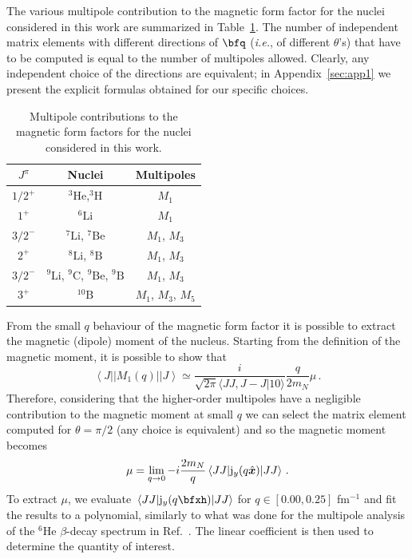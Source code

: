 \documentclass[aps,prc,floatfix,showpacs,twocolumn, preprintnumbers]{revtex4-2}
\newcommand{\beq}{\begin{equation}}
\newcommand{\eeq}{\end{equation}}
\newcommand{\het}{{}^3\text{He}}
\newcommand{\tri}{{}^3\text{H}}
\newcommand{\lisix}{{}^6\text{Li}}
\newcommand{\lisev}{{}^7\text{Li}}
\newcommand{\lieight}{{}^8\text{Li}}
\newcommand{\beight}{{}^8\text{B}}
\newcommand{\besev}{{}^7\text{Be}}
\newcommand{\linin}{{}^9\text{Li}}
\newcommand{\cnin}{{}^9\text{C}}
\newcommand{\benin}{{}^9\text{Be}}
\newcommand{\bnin}{{}^9\text{B}}
\newcommand{\bten}{{}^{10}\text{B}}
\def\beq{\begin{equation}}
\def\eeq{\end{equation}}
\begin{document}
The various multipole contribution to the magnetic form factor for the nuclei  considered in this work are summarized in Table~\ref{tab:tab_multi}. The number of independent matrix elements with different directions of $\bfq$ ({\it i.e.}, of different $\theta$'s) that have to be computed is equal to the number of multipoles allowed. Clearly, any independent choice of the directions are equivalent; in Appendix~\ref{sec:app1} we present the explicit formulas obtained for our specific choices.
\begin{table}[]
    \centering
    \begin{tabular}{ccc}
        \hline
        \hline
         $J^\pi$ & Nuclei & Multipoles \\
            \hline
         $1/2^+$ & $\het$,$\tri$ & $M_1$\\
         $1^+$ & $\lisix$ & $M_1$\\
         $3/2^-$ & $\lisev$, $\besev$ & $M_1$, $M_3$\\
         $2^+$ & $\lieight$, $\beight$ & $M_1$, $M_3$\\
         $3/2^-$ & $\linin$, $\cnin$, $\benin$, $\bnin$ & $M_1$, $M_3$\\
         $3^+$ & $\bten$& $M_1$, $M_3$, $M_5$\\
         \hline
         \hline
    \end{tabular}
    \caption{Multipole contributions to the magnetic form factors for the nuclei considered in this work.}
    \label{tab:tab_multi}
\end{table}


From the small $q$ behaviour of the magnetic form factor it is possible to extract the magnetic (dipole) moment of the nucleus. Starting from the definition of the magnetic moment, it is possible to show that~\cite{Carlson2015}
\begin{equation}
\left\langle J|| M_1(q)|| J\right\rangle \simeq \frac{i}{\sqrt{2 \pi} \langle J J,J -\!J |1 0\rangle} \frac{q}{2 m_N} \mu \,.
\end{equation}
Therefore, considering that the higher-order multipoles have a negligible contribution to the magnetic moment at small $q$ we can select the matrix element computed for $\theta=\pi/2$ (any choice is equivalent) and so the magnetic moment becomes 
\beq
\mu = \lim_{q\to 0} -i \frac{2m_N}{q}\mel{JJ}{\mathrm{j}_y(q \hat{\bm x})}{JJ}\,.
\label{eq:mm}
\eeq
To extract $\mu$, we evaluate $\mel{JJ}{\mathrm{j}_y(q\bfxh)}{JJ}$ for $q \in [0.00,0.25]$ fm$^{-1}$ and fit the results to a polynomial, similarly to what was done for the multipole analysis of the $^6$He $\beta$-decay spectrum in Ref.~\cite{King:2022zkz}. The linear coefficient is then used to determine the quantity of interest. 
\end{document}
